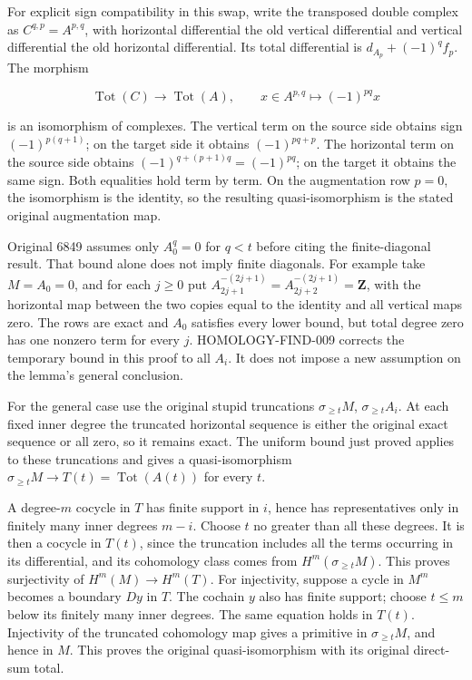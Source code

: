 \documentclass[11pt]{article}
\begin{document}
For explicit sign compatibility in this swap, write the transposed double complex as \(C^{q,p}=A^{p,q}\), with horizontal differential the old vertical differential and vertical differential the old horizontal differential. Its total differential is \(d_{A_p}+(-1)^q f_p\). The morphism

\[
\operatorname{Tot}(C)\longrightarrow\operatorname{Tot}(A),\qquad
x\in A^{p,q}\longmapsto(-1)^{pq}x
\]

is an isomorphism of complexes. The vertical term on the source side obtains sign \((-1)^{p(q+1)}\); on the target side it obtains \((-1)^{pq+p}\). The horizontal term on the source side obtains \((-1)^{q+(p+1)q}=(-1)^{pq}\); on the target it obtains the same sign. Both equalities hold term by term. On the augmentation row \(p=0\), the isomorphism is the identity, so the resulting quasi-isomorphism is the stated original augmentation map.

Original 6849 assumes only \(A_0^q=0\) for \(q<t\) before citing the finite-diagonal result. That bound alone does not imply finite diagonals. For example take \(M=A_0=0\), and for each \(j\geq0\) put \(A_{2j+1}^{-(2j+1)}=A_{2j+2}^{-(2j+1)}=\mathbf Z\), with the horizontal map between the two copies equal to the identity and all vertical maps zero. The rows are exact and \(A_0\) satisfies every lower bound, but total degree zero has one nonzero term for every \(j\). HOMOLOGY-FIND-009 corrects the temporary bound in this proof to all \(A_i\). It does not impose a new assumption on the lemma's general conclusion.

For the general case use the original stupid truncations \(\sigma_{\geq t}M\), \(\sigma_{\geq t}A_i\). At each fixed inner degree the truncated horizontal sequence is either the original exact sequence or all zero, so it remains exact. The uniform bound just proved applies to these truncations and gives a quasi-isomorphism \(\sigma_{\geq t}M\to T(t)=\operatorname{Tot}(A(t))\) for every \(t\).

A degree-\(m\) cocycle in \(T\) has finite support in \(i\), hence has representatives only in finitely many inner degrees \(m-i\). Choose \(t\) no greater than all these degrees. It is then a cocycle in \(T(t)\), since the truncation includes all the terms occurring in its differential, and its cohomology class comes from \(H^m(\sigma_{\geq t}M)\). This proves surjectivity of \(H^m(M)\to H^m(T)\). For injectivity, suppose a cycle in \(M^m\) becomes a boundary \(Dy\) in \(T\). The cochain \(y\) also has finite support; choose \(t\leq m\) below its finitely many inner degrees. The same equation holds in \(T(t)\). Injectivity of the truncated cohomology map gives a primitive in \(\sigma_{\geq t}M\), and hence in \(M\). This proves the original quasi-isomorphism with its original direct-sum total.
\end{document}
